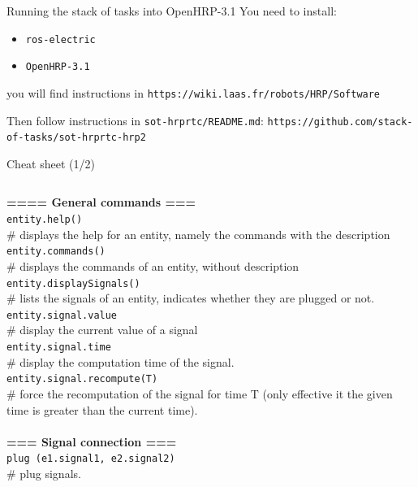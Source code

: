 %
%

\begin{frame} {Running the stack of tasks into OpenHRP-3.1}
  You need to install:
  \begin{itemize}
    \item \texttt{ros-electric}
    \item \texttt{OpenHRP-3.1}
  \end{itemize}
  you will find instructions in \texttt{\tiny https://wiki.laas.fr/robots/HRP/Software}

  Then follow instructions in \texttt{\tiny sot-hrprtc/README.md}: \texttt{https://github.com/stack-of-tasks/sot-hrprtc-hrp2}
\end{frame}


\begin{frame} {Cheat sheet (1/2)}
 \begin{columns}
  \begin{column}[t]{5cm}
{\tiny
\textbf{==== General commands ===}\\

\texttt{entity.help()}\\
\# displays the help for an entity, namely the commands with the description\\

\texttt{entity.commands()}\\
\# displays the commands of an entity, without description\\

\texttt{entity.displaySignals()}\\
\# lists the signals of an entity, indicates whether they are plugged or not.\\

\texttt{entity.signal.value}\\
\# display the current value of a signal\\

\texttt{entity.signal.time}\\
\# display the computation time of the signal.\\

\texttt{entity.signal.recompute(T)}\\
\# force the recomputation of the signal for time T (only effective it the given time is greater than the current time).\\
~\\
\textbf{=== Signal connection ===}\\
\texttt{plug (e1.signal1, e2.signal2)}\\
\# plug signals. \\

}
\end{column}
\end{columns}
\end{frame}
